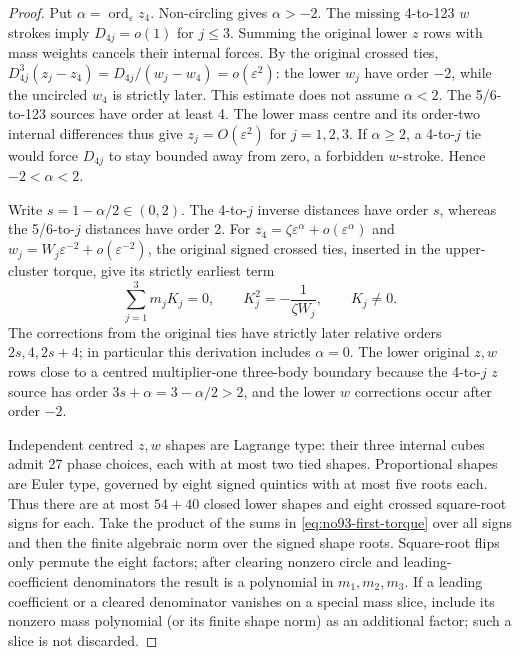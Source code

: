 \documentclass[11pt]{amsart}
\theoremstyle{remark}
\newcommand{\ord}{\operatorname{ord}}
\begin{document}
\begin{proof}
Put $\alpha=\ord_\varepsilon z_4$. Non-circling gives $\alpha>-2$. The missing 4-to-123 $w$ strokes imply $D_{4j}=o(1)$ for $j\le3$. Summing the original lower $z$ rows with mass weights cancels their internal forces. By the original crossed ties, $D_{4j}^3(z_j-z_4)=D_{4j}/(w_j-w_4)=o(\varepsilon^2)$: the lower $w_j$ have order $-2$, while the uncircled $w_4$ is strictly later. This estimate does not assume $\alpha<2$. The 5/6-to-123 sources have order at least 4. The lower mass centre and its order-two internal differences thus give $z_j=O(\varepsilon^2)$ for $j=1,2,3$. If $\alpha\ge2$, a 4-to-$j$ tie would force $D_{4j}$ to stay bounded away from zero, a forbidden $w$-stroke. Hence $-2<\alpha<2$.

Write $s=1-\alpha/2\in(0,2)$. The 4-to-$j$ inverse distances have order $s$, whereas the 5/6-to-$j$ distances have order 2. For $z_4=\zeta\varepsilon^\alpha+o(\varepsilon^\alpha)$ and $w_j=W_j\varepsilon^{-2}+o(\varepsilon^{-2})$, the original signed crossed ties, inserted in the upper-cluster torque, give its strictly earliest term
\begin{equation}\label{eq:no93-first-torque}
\sum_{j=1}^3m_jK_j=0,
\qquad K_j^2=-\frac1{\zeta W_j},\qquad K_j\ne0.
\end{equation}
The corrections from the original ties have strictly later relative orders $2s,4,2s+4$; in particular this derivation includes $\alpha=0$. The lower original $z,w$ rows close to a centred multiplier-one three-body boundary because the 4-to-$j$ $z$ source has order $3s+\alpha=3-\alpha/2>2$, and the lower $w$ corrections occur after order $-2$.

Independent centred $z,w$ shapes are Lagrange type: their three internal cubes admit 27 phase choices, each with at most two tied shapes. Proportional shapes are Euler type, governed by eight signed quintics with at most five roots each. Thus there are at most $54+40$ closed lower shapes and eight crossed square-root signs for each. Take the product of the sums in \eqref{eq:no93-first-torque} over all signs and then the finite algebraic norm over the signed shape roots. Square-root flips only permute the eight factors; after clearing nonzero circle and leading-coefficient denominators the result is a polynomial in $m_1,m_2,m_3$. If a leading coefficient or a cleared denominator vanishes on a special mass slice, include its nonzero mass polynomial (or its finite shape norm) as an additional factor; such a slice is not discarded.


\end{proof}
\end{document}
